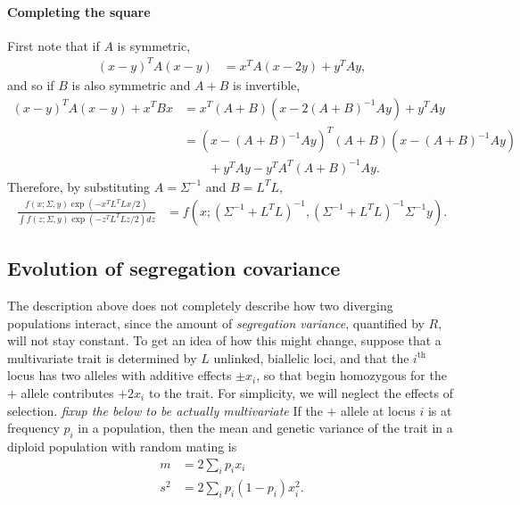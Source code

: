 \documentclass{article}
\newcommand{\plr}[1]{\todo[color=blue!25]{#1}}
\newcommand{\plri}[1]{{\color{blue}\it #1}}
\newcommand{\plr}[1]{{\color{blue}\it #1}}
\newcommand{\plri}[1]{\plr{#1}}
\newcommand{\1}{\mathbbm{1}}
\begin{document}
\paragraph{Completing the square}
First note that if $A$ is symmetric,
\begin{align*}
    (x-y)^T A (x-y)
    &=
    x^T A \left( x - 2y \right) + y^T A y ,
\end{align*}
and so if $B$ is also symmetric and $A+B$ is invertible,
\begin{align*}
    (x-y)^T A (x-y) + x^T B x
    &=
    x^T (A + B) \left( x - 2 (A + B)^{-1} A y \right) + y^T A y \\
    &=
    \left( x - (A + B)^{-1} A y \right)^T
    (A + B)
    \left( x - (A + B)^{-1} A y \right) \\
    &\qquad{}
    + y^T A y - y^T A^T (A+B)^{-1} A y .
\end{align*}
Therefore, 
by substituting $A=\Sigma^{-1}$ and $B=L^T L$,
\begin{align*}
    \frac{ f(x;\Sigma,y) \exp(-x^T L^T L x / 2)}{\int f(z;\Sigma,y) \exp(-z^T L^T L z / 2) dz}
    &=
    f(x; (\Sigma^{-1} + L^T L)^{-1}, (\Sigma^{-1}+L^T L)^{-1} \Sigma^{-1} y) .
\end{align*}

\subsection*{Evolution of segregation covariance}
\label{apx:seg_cov}

The description above does not completely describe how two diverging populations interact,
since the amount of \emph{segregation variance}, quantified by $R$,
will not stay constant.
To get an idea of how this might change,
suppose that a multivariate trait is determined by $L$ unlinked, biallelic loci,
and that the $i^\mathrm{th}$ locus has two alleles with additive effects $\pm x_i$,
so that begin homozygous for the $+$ allele contributes $+2x_i$ to the trait.
For simplicity, we will neglect the effects of selection.
\plri{fixup the below to be actually multivariate}
If the $+$ allele at locus $i$ is at frequency $p_i$ in a population,
then the mean and genetic variance of the trait in a diploid population with random mating is
\plr{the mean should be $\sum_i x_i (2p_i-1)$}
\begin{align*}
    m &= 2 \sum_i p_i x_i \\
    s^2 &= 2 \sum_i p_i (1-p_i) x_i^2 .
\end{align*}
\end{document}
